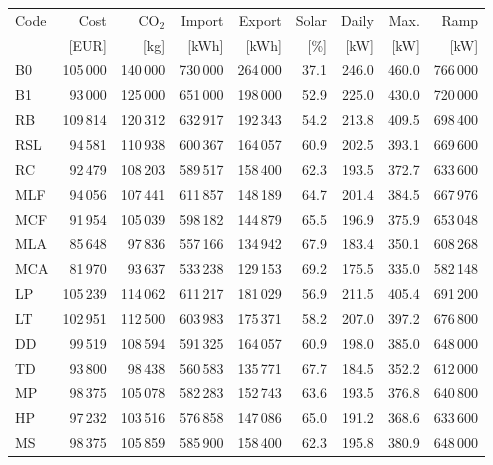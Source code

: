 \clearpage
\noindent\begin{minipage}{\textwidth}\singlespacing\captionsetup{font=footnotesize}
\setlength{\tabcolsep}{4pt}
\renewcommand{\arraystretch}{1.0}
\label{tab:full-scorecard-6-0}
\fontsize{8}{9}\selectfont
\begin{tabular*}{\textwidth}{@{\extracolsep{\fill}}lrrrrrrrr@{}}
\toprule
Code & Cost & CO$_2$ & Import & Export & Solar & Daily & Max. & Ramp\\
 & [EUR] & [kg] & [kWh] & [kWh] & [\%] & [kW] & [kW] & [kW]\\
\midrule
B0 & 105\,000 & 140\,000 & 730\,000 & 264\,000 & 37.1 & 246.0 & 460.0 & 766\,000\\
B1 & 93\,000 & 125\,000 & 651\,000 & 198\,000 & 52.9 & 225.0 & 430.0 & 720\,000\\
RB & 109\,814 & 120\,312 & 632\,917 & 192\,343 & 54.2 & 213.8 & 409.5 & 698\,400\\
RSL & 94\,581 & 110\,938 & 600\,367 & 164\,057 & 60.9 & 202.5 & 393.1 & 669\,600\\
RC & 92\,479 & 108\,203 & 589\,517 & 158\,400 & 62.3 & 193.5 & 372.7 & 633\,600\\
MLF & 94\,056 & 107\,441 & 611\,857 & 148\,189 & 64.7 & 201.4 & 384.5 & 667\,976\\
MCF & 91\,954 & 105\,039 & 598\,182 & 144\,879 & 65.5 & 196.9 & 375.9 & 653\,048\\
MLA & 85\,648 & 97\,836 & 557\,166 & 134\,942 & 67.9 & 183.4 & 350.1 & 608\,268\\
MCA & 81\,970 & 93\,637 & 533\,238 & 129\,153 & 69.2 & 175.5 & 335.0 & 582\,148\\
LP & 105\,239 & 114\,062 & 611\,217 & 181\,029 & 56.9 & 211.5 & 405.4 & 691\,200\\
LT & 102\,951 & 112\,500 & 603\,983 & 175\,371 & 58.2 & 207.0 & 397.2 & 676\,800\\
DD & 99\,519 & 108\,594 & 591\,325 & 164\,057 & 60.9 & 198.0 & 385.0 & 648\,000\\
TD & 93\,800 & 98\,438 & 560\,583 & 135\,771 & 67.7 & 184.5 & 352.2 & 612\,000\\
MP & 98\,375 & 105\,078 & 582\,283 & 152\,743 & 63.6 & 193.5 & 376.8 & 640\,800\\
HP & 97\,232 & 103\,516 & 576\,858 & 147\,086 & 65.0 & 191.2 & 368.6 & 633\,600\\
MS & 98\,375 & 105\,859 & 585\,900 & 158\,400 & 62.3 & 195.8 & 380.9 & 648\,000\\

\end{tabular*}
\end{minipage}
